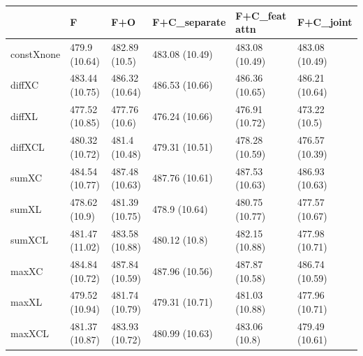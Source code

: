 \begin{tabular}{llllll}
& F & F+O & F+C_{separate} & F+C_{feat attn} & F+C_{joint} \\ 
\hline 
constXnone & 479.9 (10.64) & 482.89 (10.5) & 483.08 (10.49) & 483.08 (10.49) & 483.08 (10.49) \\ 
diffXC & 483.44 (10.75) & 486.32 (10.64) & 486.53 (10.66) & 486.36 (10.65) & 486.21 (10.64) \\ 
diffXL & 477.52 (10.85) & 477.76 (10.6) & 476.24 (10.66) & 476.91 (10.72) & 473.22 (10.5) \\ 
diffXCL & 480.32 (10.72) & 481.4 (10.48) & 479.31 (10.51) & 478.28 (10.59) & 476.57 (10.39) \\ 
sumXC & 484.54 (10.77) & 487.48 (10.63) & 487.76 (10.61) & 487.53 (10.63) & 486.93 (10.63) \\ 
sumXL & 478.62 (10.9) & 481.39 (10.75) & 478.9 (10.64) & 480.75 (10.77) & 477.57 (10.67) \\ 
sumXCL & 481.47 (11.02) & 483.58 (10.88) & 480.12 (10.8) & 482.15 (10.88) & 477.98 (10.71) \\ 
maxXC & 484.84 (10.72) & 487.84 (10.59) & 487.96 (10.56) & 487.87 (10.58) & 486.74 (10.59) \\ 
maxXL & 479.52 (10.94) & 481.74 (10.79) & 479.31 (10.71) & 481.03 (10.88) & 477.96 (10.71) \\ 
maxXCL & 481.37 (10.87) & 483.93 (10.72) & 480.99 (10.63) & 483.06 (10.8) & 479.49 (10.61) \\ 
\hline 
\end{tabular}